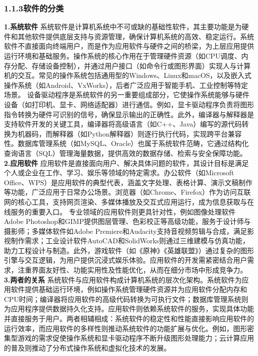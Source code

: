 \subsubsection{1.1.3软件的分类}\label{ux8f6fux4ef6ux7684ux5206ux7c7b} \textbf{1.系统软件}
系统软件是计算机系统中不可或缺的基础性软件，其主要功能是为硬件和其他软件提供底层支持与资源管理，确保计算机系统的高效、稳定运行。系统软件不直接面向终端用户，而是作为应用软件与硬件之间的桥梁，为上层应用提供运行环境和基础服务。操作系统的核心作用在于管理硬件资源（如CPU调度、内存分配、存储设备控制），并通过用户接口（如命令行或图形界面）实现人与计算机的交互。常见的操作系统包括通用型的Windows、Linux和macOS，以及嵌入式操作系统（如Android、VxWorks），后者广泛应用于智能手机、工业控制等特定场景。
设备驱动程序是系统软件的另一重要组成部分，它使操作系统能够与硬件设备（如打印机、显卡、网络适配器）进行通信。例如，显卡驱动程序负责将图形指令转换为硬件可识别的信号，确保显示输出的正确性。此外，编译器与解释器是支持软件开发的关键工具，编译器将高级语言（如C++、Java）编写的源代码转换为机器码，而解释器（如Python解释器）则逐行执行代码，实现跨平台兼容性。数据库管理系统（如MySQL、Oracle）也属于系统软件范畴，它通过结构化查询语言（SQL）管理海量数据，提供高效的数据存储、检索与安全保障功能。
\textbf{2.应用软件} 应用软件是直接面向用户、解决具体问题的软件，其设计目标是满足个人或企业在工作、学习、娱乐等领域的特定需求。办公软件（如Microsoft
Office、WPS）是应用软件的典型代表，涵盖文字处理、表格计算、演示文稿制作等功能，广泛应用于日常办公场景。浏览器（如Chrome、Firefox）作为访问互联网的核心工具，支持网页渲染、多媒体播放及交互式应用运行，成为信息获取与在线服务的重要入口。
专业领域的应用软件则更具针对性，例如图像处理软件Adobe Photoshop和GIMP提供图层管理、色彩校正等高级功能，服务于设计师与摄影师；多媒体软件如Adobe
Premiere和Audacity支持音视频剪辑与合成，满足影视制作需求；工业设计软件AutoCAD和SolidWorks则通过三维建模与仿真功能，助力工程设计与制造。此外，游戏软件（如《原神》《英雄联盟》）通过复杂的图形引擎与交互逻辑，为用户提供沉浸式娱乐体验。应用软件的开发需紧密结合用户需求，注重界面友好性、功能实用性及性能优化，从而在细分市场中形成竞争力。
\textbf{3.两者的关系}
系统软件与应用软件构成计算机系统的层次化架构。系统软件为应用软件提供基础运行环境，例如操作系统管理硬件资源并为应用软件分配内存和CPU时间；编译器将应用软件的高级代码转换为可执行文件；数据库管理系统则为应用程序提供数据持久化支持。应用软件则依赖系统软件的服务，实现具体功能并直接服务于用户。两者相辅相成：系统软件的稳定性和性能直接影响应用软件的运行效率，而应用软件的多样性则推动系统软件的功能扩展与优化。例如，图形密集型游戏的需求促使操作系统和显卡驱动程序不断升级图形处理能力；云计算应用的普及则推动了分布式操作系统和虚拟化技术的发展。
